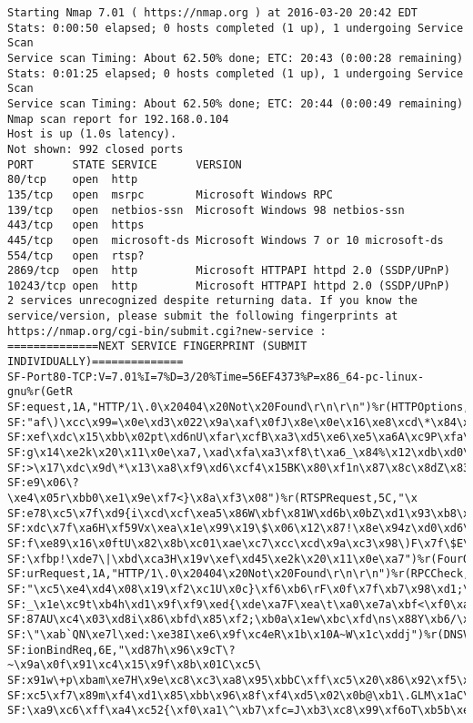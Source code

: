\documentclass[12pt,a4paper]{report}
\begin{document}
\begin{verbatim}
Starting Nmap 7.01 ( https://nmap.org ) at 2016-03-20 20:42 EDT
Stats: 0:00:50 elapsed; 0 hosts completed (1 up), 1 undergoing Service Scan
Service scan Timing: About 62.50% done; ETC: 20:43 (0:00:28 remaining)
Stats: 0:01:25 elapsed; 0 hosts completed (1 up), 1 undergoing Service Scan
Service scan Timing: About 62.50% done; ETC: 20:44 (0:00:49 remaining)
Nmap scan report for 192.168.0.104
Host is up (1.0s latency).
Not shown: 992 closed ports
PORT      STATE SERVICE      VERSION
80/tcp    open  http
135/tcp   open  msrpc        Microsoft Windows RPC
139/tcp   open  netbios-ssn  Microsoft Windows 98 netbios-ssn
443/tcp   open  https
445/tcp   open  microsoft-ds Microsoft Windows 7 or 10 microsoft-ds
554/tcp   open  rtsp?
2869/tcp  open  http         Microsoft HTTPAPI httpd 2.0 (SSDP/UPnP)
10243/tcp open  http         Microsoft HTTPAPI httpd 2.0 (SSDP/UPnP)
2 services unrecognized despite returning data. If you know the service/version, please submit the following fingerprints at https://nmap.org/cgi-bin/submit.cgi?new-service :
==============NEXT SERVICE FINGERPRINT (SUBMIT INDIVIDUALLY)==============
SF-Port80-TCP:V=7.01%I=7%D=3/20%Time=56EF4373%P=x86_64-pc-linux-gnu%r(GetR
SF:equest,1A,"HTTP/1\.0\x20404\x20Not\x20Found\r\n\r\n")%r(HTTPOptions,6B,
SF:"af\)\xcc\x99=\x0e\xd3\x022\x9a\xaf\x0fJ\x8e\x0e\x16\xe8\xcd\*\x84\xec\
SF:xef\xdc\x15\xbb\x02pt\xd6nU\xfar\xcfB\xa3\xd5\xe6\xe5\xa6A\xc9P\xfa\xb5
SF:g\x14\xe2k\x20\x11\x0e\xa7,\xad\xfa\xa3\xf8\t\xa6_\x84%\x12\xdb\xd0\x01
SF:>\x17\xdc\x9d\*\x13\xa8\xf9\xd6\xcf4\x15BK\x80\xf1n\x87\x8c\x8dZ\x83X\x
SF:e9\x06\?\xe4\x05r\xbb0\xe1\x9e\xf7<}\x8a\xf3\x08")%r(RTSPRequest,5C,"\x
SF:e78\xc5\x7f\xd9{i\xcd\xcf\xea5\x86W\xbf\x81W\xd6b\x0bZ\xd1\x93\xb8\x20\
SF:xdc\x7f\xa6H\xf59Vx\xea\x1e\x99\x19\$\x06\x12\x87!\x8e\x94z\xd0\xd6\x7f
SF:f\xe89\x16\x0ftU\x82\x8b\xc01\xae\xc7\xcc\xcd\x9a\xc3\x98\)F\x7f\$E\xb2
SF:\xfbp!\xde7\|\xbd\xca3H\x19v\xef\xd45\xe2k\x20\x11\x0e\xa7")%r(FourOhFo
SF:urRequest,1A,"HTTP/1\.0\x20404\x20Not\x20Found\r\n\r\n")%r(RPCCheck,60,
SF:"\xc5\xe4\xd4\x08\x19\xf2\xc1U\x0c}\xf6\xb6\rF\x0f\x7f\xb7\x98\xd1;\xf7
SF:_\x1e\xc9t\xb4h\xd1\x9f\xf9\xed{\xde\xa7F\xea\t\xa0\xe7a\xbf<\xf0\xa8\x
SF:87AU\xc4\x03\xd8i\x86\xbfd\x85\xf2;\xb0a\x1ew\xbc\xfd\ns\x88Y\xb6/\x14u
SF:\"\xab`QN\xe7l\xed:\xe38I\xe6\x9f\xc4eR\x1b\x10A~W\x1c\xddj")%r(DNSVers
SF:ionBindReq,6E,"\xd87h\x96\x9cT\?~\x9a\x0f\x91\xc4\x15\x9f\x8b\x01C\xc5\
SF:x91w\+p\xbam\xe7H\x9e\xc8\xc3\xa8\x95\xbbC\xff\xc5\x20\x86\x92\xf5\x01\
SF:xc5\xf7\x89m\xf4\xd1\x85\xbb\x96\x8f\xf4\xd5\x02\x0b@\xb1\.GLM\x1aC\x18
SF:\xa9\xc6\xff\xa4\xc52{\xf0\xa1\^\xb7\xfc=J\xb3\xc8\x99\xf6oT\xb5b\xeb\x

\end{verbatim}
\end{document}
